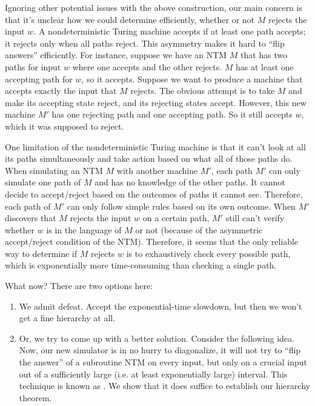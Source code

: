 \documentclass[11pt,twoside=off,numbers=noenddot]{scrbook}
\begin{document}
Ignoring other potential issues with the above construction, our main concern is that it's unclear how we could determine efficiently, whether or not $M$ rejects the input $w$. A nondeterministic Turing machine accepts if at least one path accepts; it rejects only when all paths reject. This asymmetry makes it hard to ``flip answers'' efficiently. For instance, suppose we have an NTM $M$ that has two paths for input $w$ where one accepts and the other rejects. $M$ has at least one accepting path for $w$, so it accepts. Suppose we want to produce a machine that accepts exactly the input that $M$ rejects. The obvious attempt is to take $M$ and make its accepting state reject, and its rejecting states accept. However, this new machine $M'$ has one rejecting path and one accepting path. So it still accepts $w$, which it was supposed to reject.

One limitation of the nondeterministic Turing machine is that it can't look at all its paths simultaneously and take action based on what all of those paths do. When simulating an NTM $M$ with another machine $M'$, each path $M'$ can only simulate one path of $M$ and has no knowledge of the other paths. It cannot decide to accept/reject based on the outcomes of paths it cannot see. Therefore, each path of $M'$ can only follow simple rules based on its own outcome. When $M'$ discovers that $M$ rejects the input $w$ on a certain path, $M'$ still can't verify whether $w$ is in the language of $M$ or not (because of the asymmetric accept/reject condition of the NTM). Therefore, it seems that the only reliable way to determine if $M$ rejects $w$ is to exhaustively check every possible path, which is exponentially more time-consuming than checking a single path.

What now? There are two options here:
\begin{enumerate}
  \item We admit defeat. Accept the exponential-time slowdown, but then we won't get a fine hierarchy at all.
  \item Or, we try to come up with a better solution. Consider the following idea. Now, our new simulator is in no hurry to diagonalize, it will not try to ``flip the answer'' of a subroutine NTM on every input, but only on a crucial input out of a sufficiently large (i.e. at least exponentially large) interval. This technique is known as . We show that it does suffice to establish our hierarchy theorem.
\end{enumerate}
\end{document}
